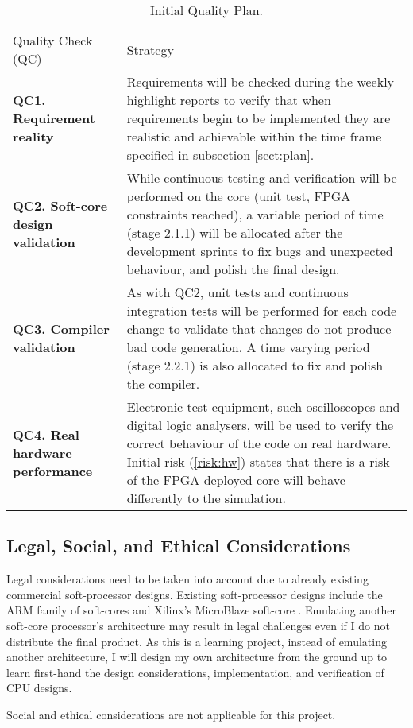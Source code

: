 \begin{table}[h]
    \begin{tabularx}{\textwidth}{|l|X|}
    \hline
    Quality Check (QC) & Strategy \\
	\specialrule{2pt}{-2pt}{0pt}
	\textbf{QC1. Requirement reality} & Requirements will be checked during the weekly highlight reports to verify that when requirements begin to be implemented they are realistic and achievable within the time frame specified in subsection \ref{sect:plan}.
	\\ \hline
	
	\textbf{QC2. Soft-core design validation} & While continuous testing and verification will be performed on the core (unit test, FPGA constraints reached), a variable period of time (stage 2.1.1) will be allocated after the development sprints to fix bugs and unexpected behaviour, and polish the final design. 
	\\ \hline
	
	\textbf{QC3. Compiler validation} & As with QC2, unit tests and continuous integration tests will be performed for each code change to validate that changes do not produce bad code generation. A time varying period (stage 2.2.1) is also allocated to fix and polish the compiler.
	\\ \hline
	
	\textbf{QC4. Real hardware performance} & Electronic test equipment, such oscilloscopes and digital logic analysers, will be used to verify the correct behaviour of the code on real hardware. Initial risk (\ref{risk:hw}) states that there is a risk of the FPGA deployed core will behave differently to the simulation.
	\\ \hline
    \end{tabularx}
    \caption{Initial Quality Plan.}
\end{table}


\subsection*{Legal, Social, and Ethical Considerations}\label{sect:legal}
Legal considerations need to be taken into account due to already existing commercial soft-processor designs. Existing soft-processor designs include the ARM family of soft-cores \citep{arm} and Xilinx's MicroBlaze soft-core \citep{microblaze}. Emulating another soft-core processor's architecture may result in legal challenges even if I do not distribute the final product. As this is a learning project, instead of emulating another architecture, I will design my own architecture from the ground up to learn first-hand the design considerations, implementation, and verification of CPU designs.

Social and ethical considerations are not applicable for this project.
